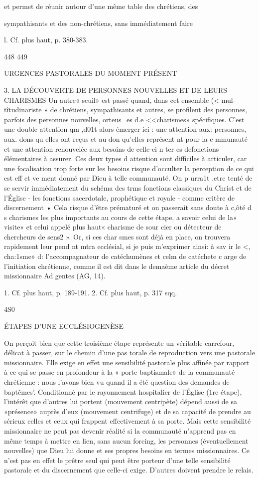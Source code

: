 {{et permet de réunir autour d'une même table des chrétiens, des		
 
sympathisants et des non-chrétiens, sans immédiatement faire
 
l. Cf. plus haut, p. 380-383.
 

448	449
 
URGENCES PASTORALES DU MOMENT PRÉSENT


3.	LA DÉCOUVERTE DE PERSONNES NOUVELLES ET DE LEURS CHARISMES
Un autre« seuil» est passé quand, dans cet ensemble (< mul­ tîtudinariste » de chrétiens, sympathisants et autres, se profilent des personnes, parfois des personnes nouvelles, orteus_es d.e
<<charismes» spécifiques. C'est une double attention qm ,d01t alors émerger ici : une attention aux: personnes, aux. dons qu elles ont reçus et au don qu'elles représent nt pour la c mmunauté et une attention renouvelée aux besoins de celle-ci n ter es defonctions élémentaires à assurer. Ces deux types d attention sont difficiles à articuler, car une focalisation trop forte sur les besoins risque d'occulter la perception de ce qui est eff ct ve­ ment donné par Dieu à telle communauté. On p urra1t .etre tenté de se servir immédiatement du schéma des trms fonctions classiques du Christ et de l'Église -	les fonctions sacerdotale, prophétique et royale -	comme critère de discernement • Cela risque d'être prématuré et on passerait sans doute à c,ôté d s charismes les plus importants au cours de cette étape, a savoir celui de la« visite» et celui appelé plus haut« charisme de sour­ cier ou détecteur de chercheurs de sens2 ». Or, si ces char smes sont déjà en place, on trouvera rapidement leur pend nt mtra­ ecclésial, si je puis m'exprimer ainsi: à sav ir le <, cha:1sme» d: l'accompagnateur de catéchumènes et celm de catéchete c arge de l'initiation chrétienne, comme il est dit dans le demaème article du décret missionnaire Ad gentes (AG, 14).

1.	Cf. plus haut, p. 189-191.
2.	Cf. plus haut, p. 317 sqq.

4S0
 
ÉTAPES D'UNE ECCLÉSIOGENÈSE

On perçoit bien que cette troisième étape représente un véritable carrefour, délicat à passer, sur le chemin d'une pas­ torale de reproduction vers une pastorale missionnaire. Elle exige en effet une sensibilité pastorale plus affinée par rapport à ce qui se passe en profondeur à la « porte baptismale» de la communauté chrétienne : nous l'avons bien vu quand il a été question des demandes de baptêmes'. Conditionné par le rayonnement hospitalier de l'Église (1re étape), l'intérêt que d'autres lui portent (mouvement centripète) dépend aussi de sa «présence» auprès d'eux (mouvement centrifuge) et de sa capacité de prendre au sérieux celles et ceux qui frappent effectivement à sa porte. Mais cette sensibilité missionnaire ne peut pas devenir réalité si la communauté n'apprend pas en même temps à mettre en lien, sans aucun forcing, les personnes (éventuellement nouvelles) que Dieu lui donne et ses propres besoins en termes missionnaires. Ce n'est pas en effet le prêtre seul qui peut être porteur d'une telle sensibilité pastorale et du discernement que celle-ci exige. D'autres doivent prendre le relais.

}}
